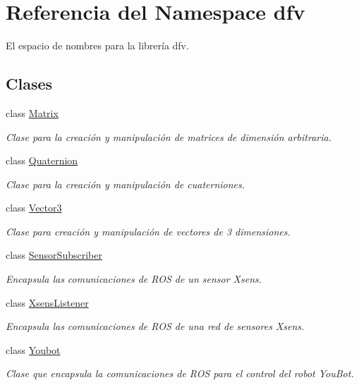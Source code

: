 \hypertarget{namespacedfv}{\section{\-Referencia del \-Namespace dfv}
\label{namespacedfv}
}


\-El espacio de nombres para la librería dfv.  


\subsection*{\-Clases}
\begin{DoxyCompactItemize}
\item 
class \hyperlink{classdfv_1_1Matrix}{\-Matrix}
\begin{DoxyCompactList}\small\item\em \-Clase para la creación y manipulación de matrices de dimensión arbitraria. \end{DoxyCompactList}\item 
class \hyperlink{classdfv_1_1Quaternion}{\-Quaternion}
\begin{DoxyCompactList}\small\item\em \-Clase para la creación y manipulación de cuaterniones. \end{DoxyCompactList}\item 
class \hyperlink{classdfv_1_1Vector3}{\-Vector3}
\begin{DoxyCompactList}\small\item\em \-Clase para creación y manipulación de vectores de 3 dimensiones. \end{DoxyCompactList}\item 
class \hyperlink{classdfv_1_1SensorSubscriber}{\-Sensor\-Subscriber}
\begin{DoxyCompactList}\small\item\em \-Encapsula las comunicaciones de \-R\-O\-S de un sensor \-Xsens. \end{DoxyCompactList}\item 
class \hyperlink{classdfv_1_1XsensListener}{\-Xsens\-Listener}
\begin{DoxyCompactList}\small\item\em \-Encapsula las comunicaciones de \-R\-O\-S de una red de sensores \-Xsens. \end{DoxyCompactList}\item 
class \hyperlink{classdfv_1_1Youbot}{\-Youbot}
\begin{DoxyCompactList}\small\item\em \-Clase que encapsula la comunicaciones de \-R\-O\-S para el control del robot \-You\-Bot. \end{DoxyCompactList}\end{DoxyCompactItemize}
